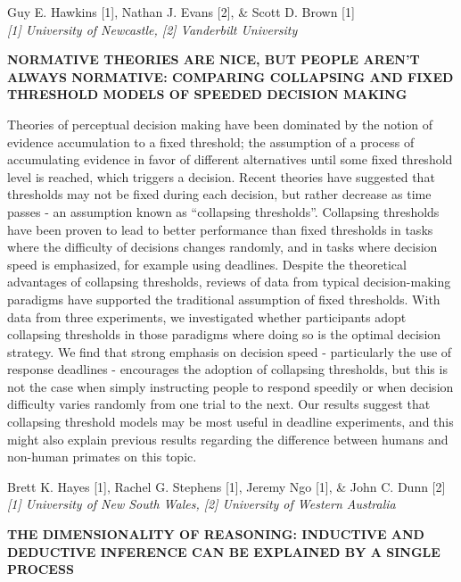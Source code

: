 \documentclass[]{article}
\begin{document}
Guy E. Hawkins {[}1{]}, Nathan J. Evans {[}2{]}, \& Scott D. Brown
{[}1{]}\\
\emph{{[}1{]} University of Newcastle, {[}2{]} Vanderbilt University}

\textbf{NORMATIVE THEORIES ARE NICE, BUT PEOPLE AREN'T ALWAYS NORMATIVE:
COMPARING COLLAPSING AND FIXED THRESHOLD MODELS OF SPEEDED DECISION
MAKING}

Theories of perceptual decision making have been dominated by the notion
of evidence accumulation to a fixed threshold; the assumption of a
process of accumulating evidence in favor of different alternatives
until some fixed threshold level is reached, which triggers a decision.
Recent theories have suggested that thresholds may not be fixed during
each decision, but rather decrease as time passes - an assumption known
as ``collapsing thresholds''. Collapsing thresholds have been proven to
lead to better performance than fixed thresholds in tasks where the
difficulty of decisions changes randomly, and in tasks where decision
speed is emphasized, for example using deadlines. Despite the
theoretical advantages of collapsing thresholds, reviews of data from
typical decision-making paradigms have supported the traditional
assumption of fixed thresholds. With data from three experiments, we
investigated whether participants adopt collapsing thresholds in those
paradigms where doing so is the optimal decision strategy. We find that
strong emphasis on decision speed - particularly the use of response
deadlines - encourages the adoption of collapsing thresholds, but this
is not the case when simply instructing people to respond speedily or
when decision difficulty varies randomly from one trial to the next. Our
results suggest that collapsing threshold models may be most useful in
deadline experiments, and this might also explain previous results
regarding the difference between humans and non-human primates on this
topic.\\
\pagebreak  

Brett K. Hayes {[}1{]}, Rachel G. Stephens {[}1{]}, Jeremy Ngo {[}1{]},
\& John C. Dunn {[}2{]}\\
\emph{{[}1{]} University of New South Wales, {[}2{]} University of
Western Australia}

\textbf{THE DIMENSIONALITY OF REASONING: INDUCTIVE AND DEDUCTIVE
INFERENCE CAN BE EXPLAINED BY A SINGLE PROCESS}
\end{document}
